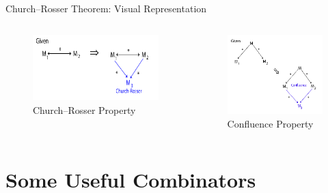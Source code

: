 \documentclass{beamer}
\begin{document}
\begin{frame}{Church–Rosser Theorem: Visual Representation}
  \begin{columns}
    \begin{figure}
      \includegraphics[width=\textwidth]{images/Church-Rosser.png}
      \caption{Church–Rosser Property}
    \end{figure}
    \begin{figure}
      \includegraphics[width=\textwidth]{images/Confluence.png}
      \caption{Confluence Property}
    \end{figure}
  \end{columns}
\end{frame}

\section{Some Useful Combinators}
\end{document}
